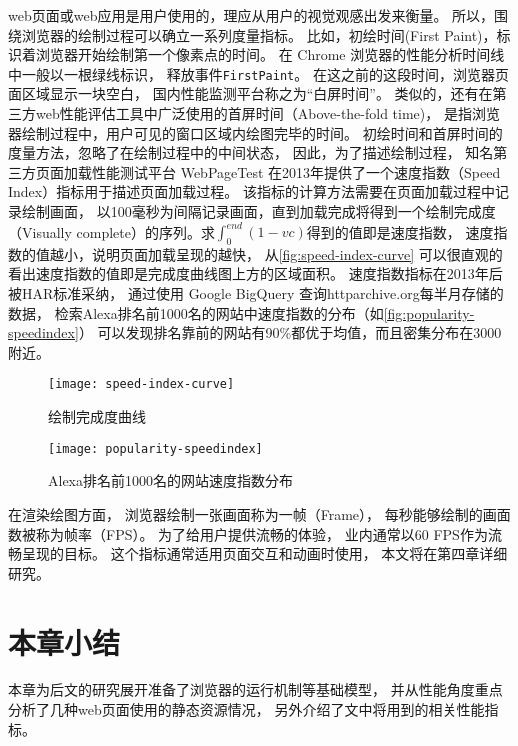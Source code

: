 web页面或web应用是用户使用的，理应从用户的视觉观感出发来衡量。
所以，围绕浏览器的绘制过程可以确立一系列度量指标。
比如，初绘时间(First Paint)，标识着浏览器开始绘制第一个像素点的时间。
在 Chrome 浏览器的性能分析时间线中一般以一根绿线标识，
释放事件\texttt{FirstPaint}。
在这之前的这段时间，浏览器页面区域显示一块空白，
国内性能监测平台称之为``白屏时间''。
类似的，还有在第三方web性能评估工具中广泛使用的首屏时间（Above-the-fold time)，
是指浏览器绘制过程中，用户可见的窗口区域内绘图完毕的时间。
初绘时间和首屏时间的度量方法，忽略了在绘制过程中的中间状态，
因此，为了描述绘制过程，
知名第三方页面加载性能测试平台 WebPageTest 在2013年提供了一个速度指数（Speed Index）指标用于描述页面加载过程。
该指标的计算方法需要在页面加载过程中记录绘制画面，
以100毫秒为间隔记录画面，直到加载完成将得到一个绘制完成度（Visually complete）的序列。求$\int _{0}^{end}{(1-vc)}$得到的值即是速度指数，
速度指数的值越小，说明页面加载呈现的越快，
从\autoref{fig:speed-index-curve} 可以很直观的看出速度指数的值即是完成度曲线图上方的区域面积。
速度指数指标在2013年后被HAR标准采纳，
通过使用 Google BigQuery 查询httparchive.org每半月存储的数据，
检索Alexa排名前1000名的网站中速度指数的分布（如\autoref{fig:popularity-speedindex}）
可以发现排名靠前的网站有90\%都优于均值，而且密集分布在3000附近。
\begin{figure}[htbp]
	\centering
	\texttt{[image: speed-index-curve]}
	\caption{绘制完成度曲线}\label{fig:speed-index-curve}
\end{figure}
\begin{figure}[htbp]
	\centering
	\texttt{[image: popularity-speedindex]}
	\caption{Alexa排名前1000名的网站速度指数分布}\label{fig:popularity-speedindex}
\end{figure}

在渲染绘图方面，
浏览器绘制一张画面称为一帧（Frame），
每秒能够绘制的画面数被称为帧率（FPS）。
为了给用户提供流畅的体验，
业内通常以60 FPS作为流畅呈现的目标。
这个指标通常适用页面交互和动画时使用，
本文将在第四章详细研究。

\section{本章小结}
本章为后文的研究展开准备了浏览器的运行机制等基础模型，
并从性能角度重点分析了几种web页面使用的静态资源情况，
另外介绍了文中将用到的相关性能指标。


